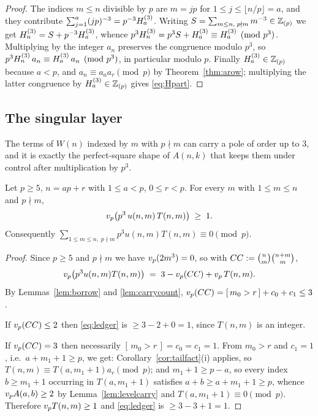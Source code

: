 \begin{proof}
The indices $m\le n$ divisible by $p$ are $m=jp$ for $1\le j\le\lfloor n/p\rfloor=a$, and
they contribute $\sum_{j=1}^{a}(jp)^{-3}=p^{-3}H^{(3)}_{a}$. Writing
$S=\sum_{m\le n,\;p\nmid m}m^{-3}\in\mathbb{Z}_{(p)}$ we get $H^{(3)}_{n}=S+p^{-3}H^{(3)}_{a}$, whence
$p^3H^{(3)}_{n}=p^3S+H^{(3)}_{a}\equiv H^{(3)}_{a}\pmod{p^3}$. Multiplying by the integer $a_n$ preserves the
congruence modulo $p^3$, so $p^3H^{(3)}_{n}\,a_n\equiv H^{(3)}_{a}\,a_n\pmod{p^3}$, in particular
modulo $p$. Finally $H^{(3)}_{a}\in\mathbb{Z}_{(p)}$ because $a<p$, and $a_n\equiv a_aa_r\pmod p$ by
Theorem~\ref{thm:arow}; multiplying the latter congruence by $H^{(3)}_{a}\in\mathbb{Z}_{(p)}$ gives
\eqref{eq:Hpart}.
\end{proof}

\subsection{The singular layer}

The terms of $W(n)$ indexed by $m$ with $p\nmid m$ can carry a pole of order up to $3$,
and it is exactly the perfect-square shape of $A(n,k)$ that keeps them under control after
multiplication by $p^3$.

\begin{lemma}\label{lem:V}
Let $p\ge5$, $n=ap+r$ with $1\le a<p$, $0\le r<p$. For every $m$ with $1\le m\le n$ and
$p\nmid m$,
\[
   v_p\bigl(p^3\,u(n,m)\,T(n,m)\bigr)\;\ge\;1 .
\]
Consequently $\displaystyle\sum_{1\le m\le n,\;p\nmid m}p^3u(n,m)T(n,m)\equiv0\pmod p$.
\end{lemma}

\begin{proof}
Since $p\ge5$ and $p\nmid m$ we have $v_p(2m^3)=0$, so with
$CC:=\binom{n}{m}\binom{n+m}{m}$,
\begin{equation}\label{eq:ledger}
   v_p\bigl(p^3u(n,m)T(n,m)\bigr)\;=\;3-v_p(CC)+v_p\,T(n,m).
\end{equation}
By Lemmas~\ref{lem:borrow} and \ref{lem:carrycount},
$v_p(CC)=[\,m_0>r\,]+c_0+c_1\le3$.

If $v_p(CC)\le2$ then \eqref{eq:ledger} is $\ge3-2+0=1$, since $T(n,m)$ is an integer.

If $v_p(CC)=3$ then necessarily $[\,m_0>r\,]=c_0=c_1=1$. From $m_0>r$ and $c_1=1$, i.e.\
$a+m_1+1\ge p$, we get: Corollary~\ref{cor:tailfact}(i) applies, so
$T(n,m)\equiv T(a,m_1+1)a_r\pmod p$; and $m_1+1\ge p-a$, so every index $b\ge m_1+1$
occurring in $T(a,m_1+1)$ satisfies $a+b\ge a+m_1+1\ge p$, whence $v_p A(a,b)\ge2$ by
Lemma~\ref{lem:levelcarry} and $T(a,m_1+1)\equiv0\pmod p$. Therefore
$v_p T(n,m)\ge1$ and \eqref{eq:ledger} is $\ge3-3+1=1$.
\end{proof}

